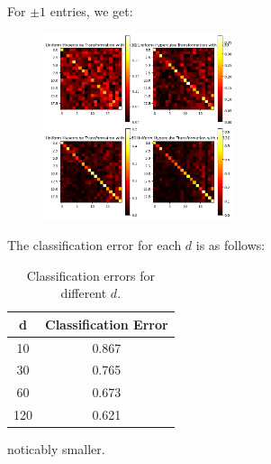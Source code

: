 \documentclass[12pt]{article}
\theoremstyle{definitionstyle}
\begin{document}
\begin{enumerate}[leftmargin=\labelsep]
\begin{enumerate}
            For $\pm 1$ entries, we get:
            \begin{figure}[H]
                \centering
                \includegraphics[width=0.5\textwidth]{uniform_heatmaps.png}
            \end{figure}
            The classification error for each $d$ is as follows:
            \begin{table}[H]
                \centering
                \begin{tabular}{|c|c|}
                    \hline
                    \textbf{d} & \textbf{Classification Error} \\ \hline
                    10         & 0.867                         \\ \hline
                    30         & 0.765                         \\ \hline
                    60         & 0.673                         \\ \hline
                    120        & 0.621                         \\ \hline
                \end{tabular}
                \caption{Classification errors for different \( d \).}
                \label{tab:classification_errors}
            \end{table}
            noticably smaller.


\end{enumerate}
\end{enumerate}
\end{document}
